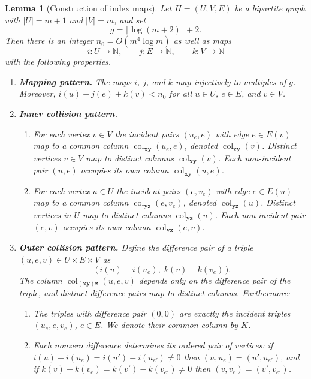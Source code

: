 \documentclass[11pt]{article}
\newtheorem{lemma}[theorem]{Lemma}
\theoremstyle{definition}
\theoremstyle{remark}
\newcommand{\N}{\mathbb{N}}
\newcommand{\col}{\operatorname{col}}
\newcommand{\vv}[1]{\mathbf{#1}}
\begin{document}
\begin{lemma}[Construction of index maps]
	\label{lem:indices}
Let $H=(U,V,E)$ be a bipartite graph with $|U|=m+1$ and $|V|=m$, and set
\[
g=\lceil\log(m+2)\rceil+2.
\]
Then there is an integer $n_0=O(m^4\log m)$ as well as maps
\[
i:U\to\N,\qquad j:E\to\N,\qquad k:V\to\N
\]
with the following properties.
\begin{enumerate}[label=(\roman*)]
\item \textbf{Mapping pattern.} The maps $i$, $j$, and $k$ map injectively to multiples of $g$. Moreover, $i(u)+j(e)+k(v)<n_0$ for all $u\in U$, $e\in E$, and $v\in V$.
\item \textbf{Inner collision pattern.}
\begin{enumerate}[label=(\alph*)]
\item For each vertex $v\in V$ the
incident pairs $(u_e,e)$ with edge $e\in E(v)$ map to a common column $\col_{\vv{xy}}(u_e,e)$, denoted
$\col_{\vv{xy}}(v)$. Distinct vertices $v\in V$ map to distinct columns $\col_{\vv{xy}}(v)$. Each non-incident pair $(u,e)$ occupies its own column $\col_{\vv{xy}}(u,e)$.
\item For each vertex $u\in U$ the
incident pairs $(e,v_e)$ with edge $e\in E(u)$ map to a common column $\col_{\vv{yz}}(e,v_e)$, denoted
$\col_{\vv{yz}}(u)$. Distinct vertices in $U$ map to distinct columns $\col_{\vv{yz}}(u)$. Each non-incident pair $(e,v)$ occupies its own column $\col_{\vv{yz}}(e,v)$.
\end{enumerate}
\item \textbf{Outer collision pattern.} Define the \emph{difference pair} of a triple
$(u,e,v)\in U\times E\times V$ as
\[
\bigl(\,i(u)-i(u_e),\;k(v)-k(v_e)\,\bigr).
\]
The column $\col_{(\vv{x}\vv{y})\vv{z}}(u,e,v)$ depends only on the difference pair of the
triple, and distinct difference pairs map to distinct columns. Furthermore:
\begin{enumerate}[label=(\alph*)]
\item The triples with difference pair $(0,0)$ are exactly the incident triples
$(u_e,e,v_e)$, $e\in E$. We denote their common column by $K$.
\item Each nonzero difference determines its ordered pair of vertices: if
$i(u)-i(u_e)=i(u')-i(u_{e'})\ne0$ then $(u,u_e)=(u',u_{e'})$, and if
$k(v)-k(v_e)=k(v')-k(v_{e'})\ne0$ then $(v,v_e)=(v',v_{e'})$.
\end{enumerate}
\end{enumerate}
\end{lemma}
\end{document}
